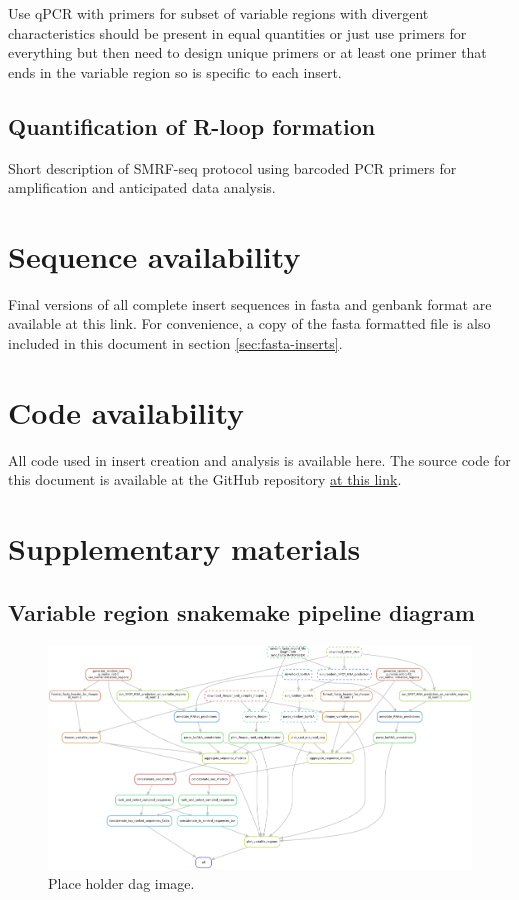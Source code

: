 \documentclass[11pt]{article}
\begin{document}
Use qPCR with primers for subset of variable regions with divergent characteristics should be present in equal quantities or just use primers for everything but then need to design unique primers or at least one primer that ends in the variable region so is specific to each insert. 

\subsection{Quantification of R-loop formation }

Short description of SMRF-seq protocol using barcoded PCR primers for amplification 
and anticipated data analysis. 

\section{Sequence availability}

Final versions of all complete insert sequences in fasta and genbank format are available at this link. For convenience, a copy of the fasta formatted file is also included in this document in section \ref{sec:fasta-inserts}. 


\section{Code availability}

All code used in insert creation and analysis is available here. The source code for this document is available at the GitHub repository \href{https://github.com/EthanHolleman/plasmid-VR-design}{at this link}.

\section{Supplementary materials}

\subsection{Variable region snakemake pipeline diagram}

\begin{figure}[H]
	\includegraphics[width=15cm]{images/misc/dag.png}
	\centering
	\caption{Place holder dag image.}
\end{figure}
\end{document}
